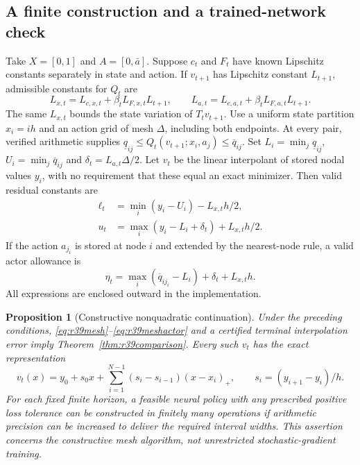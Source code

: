 \documentclass[ecta,nameyear,draft]{econsocart}
\newtheorem{proposition}[theorem]{Proposition}
\theoremstyle{definition}
\theoremstyle{remark}
\begin{document}
\subsection{A finite construction and a trained-network check}
Take $X=[0,1]$ and $A=[0,\bar a]$. Suppose $c_t$ and $F_t$ have known
Lipschitz constants separately in state and action. If $v_{t+1}$ has
Lipschitz constant $L_{t+1}$, admissible constants for $Q_t$ are
\begin{equation}\label{eq:r39lipschitz}
 L_{x,t}=L_{c,x,t}+\beta_t L_{F,x,t}L_{t+1},\qquad
 L_{a,t}=L_{c,a,t}+\beta_t L_{F,a,t}L_{t+1}.
\end{equation}
The same $L_{x,t}$ bounds the state variation of $T_tv_{t+1}$.
Use a uniform state partition $x_i=ih$ and an action grid of mesh $\Delta$,
including both endpoints. At every pair, verified arithmetic supplies
$\underline q_{ij}\leq Q_t(v_{t+1};x_i,a_j)\leq\overline q_{ij}$.
Set $L_i=\min_j\underline q_{ij}$, $U_i=\min_j\overline q_{ij}$ and
$\delta_t=L_{a,t}\Delta/2$. Let $v_t$ be the linear interpolant of stored
nodal values $y_i$, with no requirement that these equal an exact minimizer.
Then valid residual constants are
\begin{align}\label{eq:r39mesh}
 \ell_t&=\min_i(y_i-U_i)-L_{x,t}h/2,\\
 u_t&=\max_i(y_i-L_i+\delta_t)+L_{x,t}h/2.\nonumber
\end{align}
If the action $a_{j_i}$ is stored at node $i$ and extended by the
nearest-node rule, a valid actor allowance is
\begin{equation}\label{eq:r39meshactor}
 \eta_t=\max_i(\overline q_{i j_i}-L_i)+\delta_t+L_{x,t}h.
\end{equation}
All expressions are enclosed outward in the implementation.

\begin{proposition}[Constructive nonquadratic continuation]\label{prop:r39construction}
Under the preceding conditions, \eqref{eq:r39mesh}--\eqref{eq:r39meshactor}
and a certified terminal interpolation error imply
Theorem~\ref{thm:r39comparison}. Every such $v_t$ has the exact representation
\begin{equation}\label{eq:r39relu}
 v_t(x)=y_0+s_0x+\sum_{i=1}^{N-1}(s_i-s_{i-1})(x-x_i)_+,
 \qquad s_i=(y_{i+1}-y_i)/h.
\end{equation}
For each fixed finite horizon, a feasible neural policy with any prescribed
positive loss tolerance can be constructed in finitely many operations if
arithmetic precision can be increased to deliver the required interval widths.
This assertion concerns the constructive mesh algorithm, not unrestricted
stochastic-gradient training.
\end{proposition}
\end{document}
